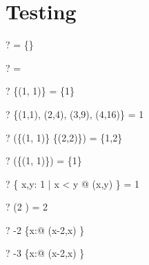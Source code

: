 \documentclass{article}
\newcommand{\negate}{-}
\begin{document}
\section{Testing \dom}
\begin{zed} \vdash? \dom \emptyset = \{\} \end{zed}
\begin{zed} \vdash? \dom \emptyset = \emptyset \end{zed}
\begin{zed} \vdash? \dom \{(1, 1)\} = \{1\} \end{zed}
\begin{zed} \vdash? \dom \{(1,1), (2,4), (3,9), (4,16)\} = 1  \end{zed}
\begin{zed} \vdash? \dom (\{(1, 1)\} \cup \{(2,2)\}) = \{1,2\} \end{zed}
\begin{zed} \vdash? \dom (\emptyset \cup \{(1, 1)\}) = \{1\} \end{zed}
\begin{zed} \vdash? \dom \{ x,y: 1  | x < y @ (x,y) \} = 1  \end{zed}
\begin{zed} \vdash? \dom (2   ) = 2  \end{zed}
\begin{zed} \vdash? \negate 2 \in \dom \{x:\nat @ (x-2,x) \} \end{zed}
\begin{zed} \vdash? \negate 3 \notin \dom \{x:\nat @ (x-2,x) \} \end{zed}
\end{document}
